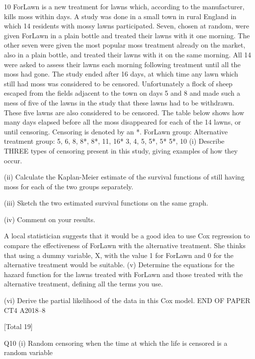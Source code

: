\documentclass[a4paper,12pt]{article}
\begin{document}
10
ForLawn is a new treatment for lawns which, according to the manufacturer, kills
moss within days. A study was done in a small town in rural England in which
14 residents with mossy lawns participated. Seven, chosen at random, were given
ForLawn in a plain bottle and treated their lawns with it one morning. The other
seven were given the most popular moss treatment already on the market, also in a
plain bottle, and treated their lawns with it on the same morning. All 14 were asked
to assess their lawns each morning following treatment until all the moss had gone.
The study ended after 16 days, at which time any lawn which still had moss was
considered to be censored.
Unfortunately a flock of sheep escaped from the fields adjacent to the town on days 5
and 8 and made such a mess of five of the lawns in the study that these lawns had to
be withdrawn. These five lawns are also considered to be censored.
The table below shows how many days elapsed before all the moss disappeared for
each of the 14 lawns, or until censoring. Censoring is denoted by an *.
ForLawn group:
Alternative treatment group:
5, 6, 8, 8*, 8*, 11, 16*
3, 4, 5, 5*, 5* 5*, 10
(i) Describe THREE types of censoring present in this study, giving examples of
how they occur.

(ii) Calculate the Kaplan-Meier estimate of the survival functions of still having
moss for each of the two groups separately.

(iii) Sketch the two estimated survival functions on the same graph.

(iv) Comment on your results.

A local statistician suggests that it would be a good idea to use Cox regression to
compare the effectiveness of ForLawn with the alternative treatment. She thinks that
using a dummy variable, X, with the value 1 for ForLawn and 0 for the alternative
treatment would be suitable.
(v) Determine the equations for the hazard function for the lawns treated with
ForLawn and those treated with the alternative treatment, defining all the terms
you use.

(vi)
 Derive the partial likelihood of the data in this Cox model.
END OF PAPER
CT4 A2018–8

[Total 19]

Q10
(i)
Random censoring when the time at which the life is censored is a random
variable
\end{document}
